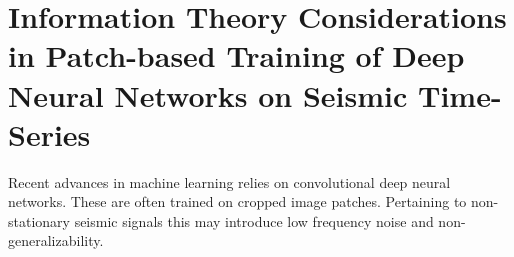\chapter{Information Theory Considerations in Patch-based Training of Deep Neural Networks on Seismic Time-Series}
Recent advances in machine learning relies on convolutional deep neural networks. These are often trained on cropped image patches. Pertaining to non-stationary seismic signals this may introduce low frequency noise and non-generalizability.

{\vfill\hfill\newline{}}


